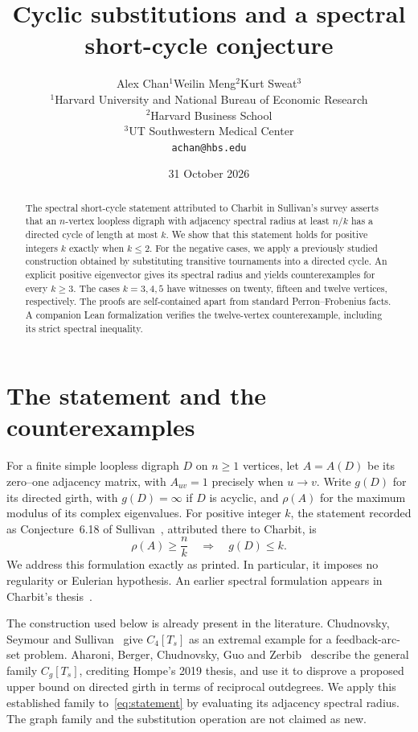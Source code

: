 \documentclass[11pt]{article}
\title{Cyclic substitutions and a spectral short-cycle conjecture}
\author{Alex Chan$^{1}$\quad Weilin Meng$^{2}$\quad Kurt Sweat$^{3}$\\[6pt]
  \small $^{1}$Harvard University and National Bureau of Economic Research\\
  \small $^{2}$Harvard Business School\\
  \small $^{3}$UT Southwestern Medical Center\\[3pt]
  \small \texttt{achan@hbs.edu}}
\date{31 October 2026}
\begin{document}
\maketitle

\begin{abstract}
The spectral short-cycle statement attributed to Charbit in Sullivan's survey asserts that an $n$-vertex loopless digraph with adjacency spectral radius at least $n/k$ has a directed cycle of length at most $k$. We show that this statement holds for positive integers $k$ exactly when $k\leq2$. For the negative cases, we apply a previously studied construction obtained by substituting transitive tournaments into a directed cycle. An explicit positive eigenvector gives its spectral radius and yields counterexamples for every $k\geq3$. The cases $k=3,4,5$ have witnesses on twenty, fifteen and twelve vertices, respectively. The proofs are self-contained apart from standard Perron--Frobenius facts. A companion Lean formalization verifies the twelve-vertex counterexample, including its strict spectral inequality.
\end{abstract}

\section{The statement and the counterexamples}

For a finite simple loopless digraph $D$ on $n\geq1$ vertices, let $A=A(D)$ be its zero--one adjacency matrix, with $A_{uv}=1$ precisely when $u\to v$. Write $g(D)$ for its directed girth, with $g(D)=\infty$ if $D$ is acyclic, and $\rho(A)$ for the maximum modulus of its complex eigenvalues. For positive integer $k$, the statement recorded as Conjecture~6.18 of Sullivan~\cite{sullivan}, attributed there to Charbit, is
\begin{equation}\label{eq:statement}
 \rho(A)\geq\frac{n}{k}\quad\Longrightarrow\quad g(D)\leq k.
\end{equation}
We address this formulation exactly as printed. In particular, it imposes no regularity or Eulerian hypothesis. An earlier spectral formulation appears in Charbit's thesis~\cite[Section~5.4]{charbit}.

The construction used below is already present in the literature. Chudnovsky, Seymour and Sullivan~\cite[Section~1]{css} give $C_4[T_s]$ as an extremal example for a feedback-arc-set problem. Aharoni, Berger, Chudnovsky, Guo and Zerbib~\cite[Section~2]{aharoni} describe the general family $C_g[T_s]$, crediting Hompe's 2019 thesis, and use it to disprove a proposed upper bound on directed girth in terms of reciprocal outdegrees. We apply this established family to~\eqref{eq:statement} by evaluating its adjacency spectral radius. The graph family and the substitution operation are not claimed as new.
\end{document}
